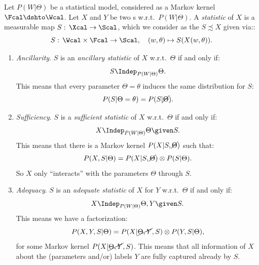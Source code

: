 \begin{Eg} Let $P(W|\Theta)$ be a statistical model, considered as a Markov kernel $\Fcal \dshto \Wcal$. Let $X$ and $Y$ be two \trv{}s w.r.t.\ $P(W|\Theta)$.
    A \emph{statistic} of $X$ is a measurable map $S:\,\Xcal \to \Scal$, which we consider as the  \trv{} $S\precsim X$ given via::
    \[ S:\,\Wcal \times \Fcal \to \Scal,\quad (w,\theta) \mapsto S(X(w,\theta)). \]
\begin{enumerate}
\item \emph{Ancillarity}. $S$ is an \emph{ancillary statistic} of $X$ w.r.t.\ $\Theta$ if and only if:
\[ S \Indep_{P(W|\Theta)} \Theta.\]
This means that every parameter $\Theta=\theta$ induces the same distribution for $S$: 
\[P(S|\Theta=\theta) = P(S|\cancel{\Theta}).\]
\item \emph{Sufficiency}. $S$ is a \emph{sufficient statistic} of $X$ w.r.t.\ $\Theta$ if and only if:
\[ X \Indep_{P(W|\Theta)} \Theta \given S.\]
This means that there is a Markov kernel $P(X|S,\cancel{\Theta})$ such that:
\[ P(X,S|\Theta) = P(X|S,\cancel{\Theta}) \otimes P(S|\Theta).\]
So $X$ only ``interacts'' with the parameters $\Theta$ through $S$.
\item \emph{Adequacy}. $S$ is an \emph{adequate statistic} of $X$ for $Y$ w.r.t.\ $\Theta$ if and only if:
\[ X \Indep_{P(W|\Theta)} \Theta,Y \given S.\]
This means we have a factorization:
\[ P(X,Y,S|\Theta) = P(X|\cancel{\Theta,Y},S) \otimes P(Y,S|\Theta),\]
for some Markov kernel $P(X|\cancel{\Theta,Y},S)$.
This means that all information of $X$ about the (parameters and/or) labels $Y$ are fully captured already by $S$.
\end{enumerate}
\end{Eg}

